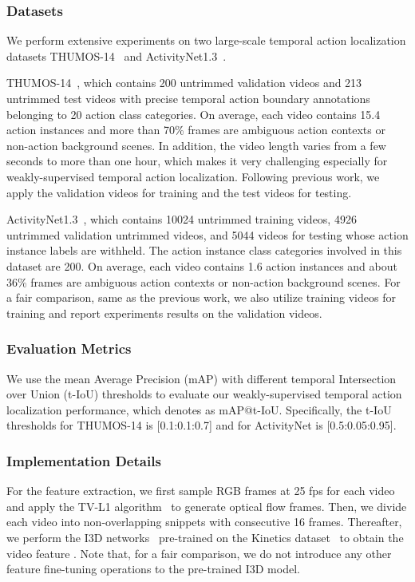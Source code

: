 \documentclass[journal,comsoc]{IEEEtran}
\begin{document}
\subsubsection{Datasets}
\par We perform extensive experiments on two large-scale temporal action localization datasets THUMOS-14~\cite{thu14_dataset} and ActivityNet1.3~\cite{Activitynet}.
\par THUMOS-14~\cite{thu14_dataset}, which contains 200 untrimmed validation videos and 213 untrimmed test videos with precise temporal action boundary annotations belonging to 20 action class categories. On average, each video contains 15.4 action instances and more than 70\% frames are ambiguous action contexts or non-action background scenes. In addition, the video length varies from a few seconds to more than one hour, which makes it very challenging especially for weakly-supervised temporal action localization. Following previous work, we apply the validation videos for training and the test videos for testing.
\par ActivityNet1.3~\cite{Activitynet}, which contains 10024 untrimmed training videos, 4926 untrimmed validation untrimmed videos, and 5044 videos for testing whose action instance labels are withheld. The action instance class categories involved in this dataset are 200. On average, each video contains 1.6 action instances and about 36\% frames are ambiguous action contexts or non-action background scenes. For a fair comparison, same as the previous work, we also utilize training videos for training and report experiments results on the validation videos.

\subsubsection{Evaluation Metrics}
\par We use the mean Average Precision (mAP) with different temporal Intersection over Union (t-IoU) thresholds to evaluate our weakly-supervised temporal action localization performance, which denotes as mAP@t-IoU. Specifically, the t-IoU thresholds for THUMOS-14 is [0.1:0.1:0.7] and for ActivityNet is [0.5:0.05:0.95].

\subsubsection{Implementation Details}

\par For the feature extraction, we first sample RGB frames at 25 fps for each video and apply the TV-L1 algorithm~\cite{tvl_optical_flow} to generate optical flow frames. Then, we divide each video into non-overlapping snippets with consecutive 16 frames. Thereafter, we perform the I3D networks~\cite{I3D} pre-trained on the Kinetics dataset~\cite{kinetics_dataset} to obtain the video feature . Note that, for a fair comparison, we do not introduce any other feature fine-tuning operations to the pre-trained I3D model.
\end{document}
